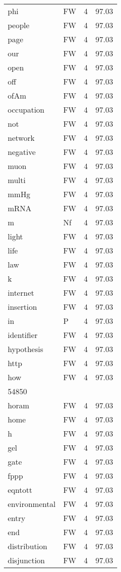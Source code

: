 \documentclass[twocolumn]{book}
\begin{document}
\begin{supertabular}{llrr}
phi & FW & 4 &  97.03\\
people & FW & 4 &  97.03\\
page & FW & 4 &  97.03\\
our & FW & 4 &  97.03\\
open & FW & 4 &  97.03\\
off & FW & 4 &  97.03\\
ofAm & FW & 4 &  97.03\\
occupation & FW & 4 &  97.03\\
not & FW & 4 &  97.03\\
network & FW & 4 &  97.03\\
negative & FW & 4 &  97.03\\
muon & FW & 4 &  97.03\\
multi & FW & 4 &  97.03\\
mmHg & FW & 4 &  97.03\\
mRNA & FW & 4 &  97.03\\
m & Nf & 4 &  97.03\\
light & FW & 4 &  97.03\\
life & FW & 4 &  97.03\\
law & FW & 4 &  97.03\\
k & FW & 4 &  97.03\\
internet & FW & 4 &  97.03\\
insertion & FW & 4 &  97.03\\
in & P & 4 &  97.03\\
identifier & FW & 4 &  97.03\\
hypothesis & FW & 4 &  97.03\\
http & FW & 4 &  97.03\\
how & FW & 4 &  97.03\\
54850\\
horam & FW & 4 &  97.03\\
home & FW & 4 &  97.03\\
h & FW & 4 &  97.03\\
gel & FW & 4 &  97.03\\
gate & FW & 4 &  97.03\\
fppp & FW & 4 &  97.03\\
eqntott & FW & 4 &  97.03\\
environmental & FW & 4 &  97.03\\
entry & FW & 4 &  97.03\\
end & FW & 4 &  97.03\\
distribution & FW & 4 &  97.03\\
disjunction & FW & 4 &  97.03\\

\end{supertabular}
\end{document}
